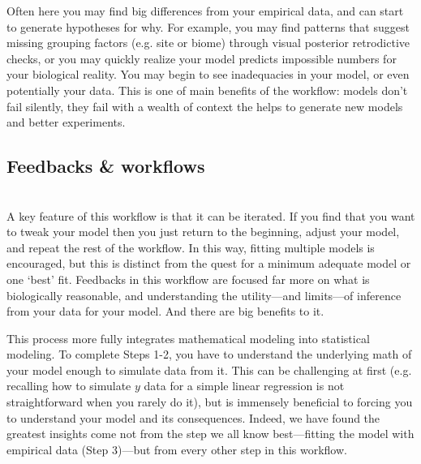 \documentclass[11pt]{article}
\begin{document}
Often here you may find big differences from your empirical data, and can start to generate hypotheses for why. For example, you may find patterns that suggest missing grouping factors (e.g. site or biome) through visual posterior retrodictive checks, or you may quickly realize your model predicts impossible numbers for your biological reality. You may begin to see inadequacies in your model, or even potentially your data.  This is one of main benefits of the workflow: models don't fail silently, they fail with a wealth of context the helps to generate new models and better experiments.

\subsection*{Feedbacks \& workflows}\\
A key feature of this workflow is that it can be iterated.  If you find that you want to tweak your model then you just return to the beginning, adjust your model, and repeat the rest of the workflow. In this way, fitting multiple models is encouraged, but this is distinct from the quest for a minimum adequate model or one `best' fit. Feedbacks in this workflow are focused far more on what is biologically reasonable, and understanding the utility---and limits---of inference from your data for your model.  And there are big benefits to it. 

This process more fully integrates mathematical modeling into statistical modeling. To complete Steps 1-2, you have to understand the underlying math of your model enough to simulate data from it. This can be challenging at first (e.g. recalling how to simulate $y$ data for a simple linear regression is not straightforward when you rarely do it), but is immensely beneficial to forcing you to understand your model and its consequences. Indeed, we have found the greatest insights come not from the step we all know best---fitting the model with empirical data (Step 3)---but from every other step in this workflow. %
\end{document}
